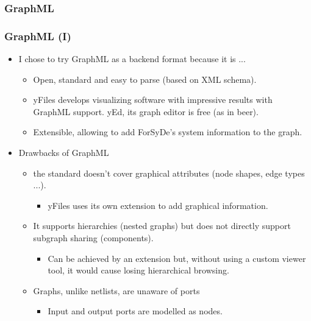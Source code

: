 \documentclass{beamer}
\begin{document}
\subsubsection{GraphML}
\begin{frame}
  \frametitle{GraphML (I)}
  \begin{itemize}
  \item I chose to try GraphML as a backend format because it is ...
    \begin{itemize}
    \item Open, standard and easy to parse (based on XML schema).
    \item yFiles develops visualizing software
      with impressive results with GraphML support. 
      yEd, its graph editor is free (as in beer). 
    \item Extensible, allowing to add ForSyDe's system information to
      the graph.
    \end{itemize}
  \item Drawbacks of GraphML
    \begin{itemize}
    \item the standard doesn't cover graphical attributes (node shapes, edge types ...).
      \begin{itemize}
      \item yFiles uses its own extension to add graphical information.
      \end{itemize}
    \item It supports hierarchies (nested graphs) but does not
      directly support subgraph sharing (components).
      \begin{itemize}
      \item Can be achieved by an extension but, without using a
        custom viewer tool, it would cause losing hierarchical
        browsing.
      \end{itemize}
    \item Graphs, unlike netlists, are unaware of ports
      \begin{itemize}
        \item Input and output ports are modelled as nodes.
      \end{itemize}
    \end{itemize}
  \end{itemize}
\end{frame}
\end{document}
